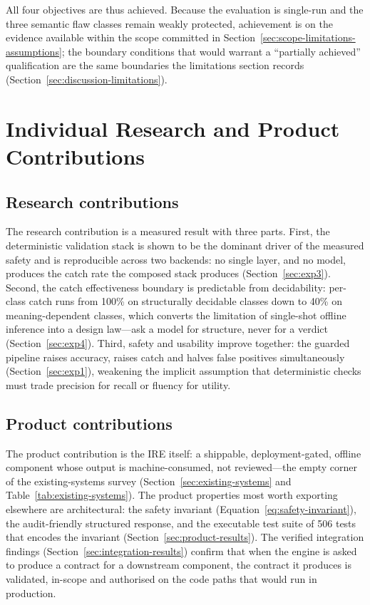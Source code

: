 All four objectives are thus achieved. Because the evaluation is single-run and
the three semantic flaw classes remain weakly protected, achievement is on the
evidence available within the scope committed in Section~\ref{sec:scope-limitations-assumptions};
the boundary conditions that would warrant a ``partially achieved''
qualification are the same boundaries the limitations section records
(Section~\ref{sec:discussion-limitations}).

\section{Individual Research and Product Contributions}\label{sec:contributions}

\subsection*{Research contributions}

The research contribution is a measured result with three parts. First, the
deterministic validation stack is shown to be the dominant driver of the
measured safety and is reproducible across two backends: no single layer, and
no model, produces the catch rate the composed stack produces
(Section~\ref{sec:exp3}). Second, the catch effectiveness boundary is
predictable from decidability: per-class catch runs from 100\% on structurally
decidable classes down to 40\% on meaning-dependent classes, which converts the
limitation of single-shot offline inference into a design law---ask a model for
structure, never for a verdict (Section~\ref{sec:exp4}). Third, safety and
usability improve together: the guarded pipeline raises accuracy, raises catch
and halves false positives simultaneously (Section~\ref{sec:exp1}), weakening
the implicit assumption that deterministic checks must trade precision for
recall or fluency for utility.

\subsection*{Product contributions}

The product contribution is the IRE itself: a shippable,
deployment-gated, offline component whose output is machine-consumed, not
reviewed---the empty corner of the existing-systems survey (Section~\ref{sec:existing-systems}
and Table~\ref{tab:existing-systems}). The product properties most worth
exporting elsewhere are architectural: the safety invariant
(Equation~\ref{eq:safety-invariant}), the audit-friendly structured response,
and the executable test suite of 506 tests that encodes the invariant
(Section~\ref{sec:product-results}). The verified integration findings
(Section~\ref{sec:integration-results}) confirm that when the engine is asked
to produce a contract for a downstream component, the contract it produces is
validated, in-scope and authorised on the code paths that would run in
production.

